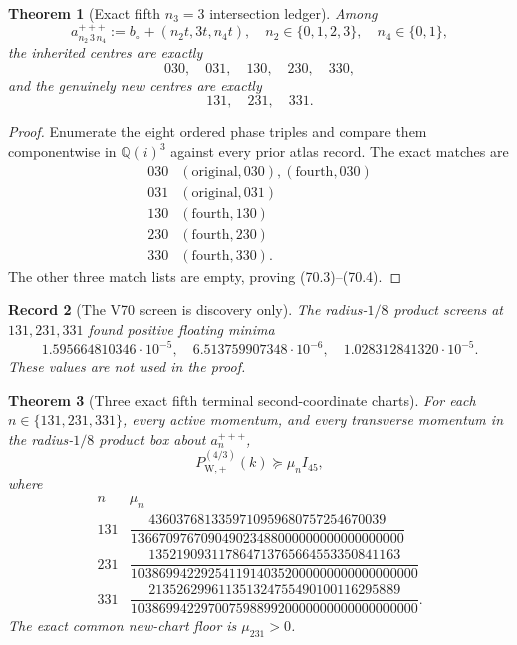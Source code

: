 \documentclass[11pt,oneside]{article}
\newtheorem{theorem}{Theorem}[section]
\newtheorem{record}[theorem]{Record}
\theoremstyle{definition}
\theoremstyle{remark}
\begin{document}
\begin{theorem}[Exact fifth \(n_3=3\) intersection ledger]
\label{thm:newv70-intersections}
Among
\[
 a_{n_2\,3\,n_4}^{+++}
 :=b_\circ+(n_2t,3t,n_4t),
 \quad n_2\in\{0,1,2,3\},\quad n_4\in\{0,1\},         \tag{70.2}
\]
the inherited centres are exactly
\[
 030,\quad031,\quad130,\quad230,\quad330,             \tag{70.3}
\]
and the genuinely new centres are exactly
\[
 131,\quad231,\quad331.                               \tag{70.4}
\]
\end{theorem}

\begin{proof}
Enumerate the eight ordered phase triples and compare them
componentwise in \(\mathbb Q(i)^3\) against every prior atlas
record.  The exact matches are
\[
\begin{array}{c|l}
030&(\mathrm{original},030),(\mathrm{fourth},030)\\
031&(\mathrm{original},031)\\
130&(\mathrm{fourth},130)\\
230&(\mathrm{fourth},230)\\
330&(\mathrm{fourth},330).
\end{array}
\]
The other three match lists are empty, proving (70.3)--(70.4).
\end{proof}

\begin{record}[The V70 screen is discovery only]
\label{rec:newv70-screen}
The radius-\(1/8\) product screens at \(131,231,331\) found positive
floating minima
\[
 1.595664810346\cdot10^{-5},\quad
 6.513759907348\cdot10^{-6},\quad
 1.028312841320\cdot10^{-5}.                          \tag{70.5}
\]
These values are not used in the proof.
\end{record}

\begin{theorem}[Three exact fifth terminal second-coordinate charts]
\label{thm:newv70-three-charts}
For each \(n\in\{131,231,331\}\), every active momentum, and every
transverse momentum in the radius-\(1/8\) product box about
\(a_n^{+++}\),
\[
 P_{\mathrm W,+}^{(4/3)}(k)\succeq\mu_nI_{45},       \tag{70.6}
\]
where
\[
\begin{array}{c|c}
n&\mu_n\\ \hline
131&
\dfrac{4360376813359710959680757254670039}
 {136670976709049023488000000000000000000}\\[6pt]
231&
\dfrac{135219093117864713765664553350841163}
 {10386994229254119140352000000000000000000}\\[6pt]
331&
\dfrac{213526299611351324755490100116295889}
 {10386994229700759889920000000000000000000}.
\end{array}                                           \tag{70.7}
\]
The exact common new-chart floor is \(\mu_{231}>0\).
\end{theorem}
\end{document}

